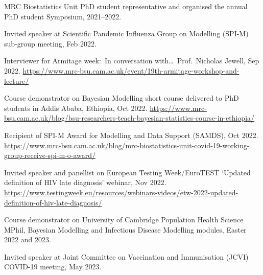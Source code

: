 \begin{spacing}{0.9}
    \begin{description}
        \item MRC Biostatistics Unit PhD student representative and organised the annual PhD student Symposium, 2021--2022.
        \item Invited speaker at Scientific Pandemic Influenza Group on Modelling (SPI-M) sub-group meeting, Feb 2022.
        \item Interviewer for Armitage week:\ In conversation with\ldots\ Prof.\ Nicholas Jewell, Sep 2022. \url{https://www.mrc-bsu.cam.ac.uk/event/19th-armitage-workshop-and-lecture/}
        \item Course demonstrator on Bayesian Modelling short course delivered to PhD students in Addis Ababa, Ethiopia, Oct 2022. \url{https://www.mrc-bsu.cam.ac.uk/blog/bsu-researchers-teach-bayesian-statistics-course-in-ethiopia/}
        \item Recipient of SPI-M Award for Modelling and Data Support (SAMDS), Oct 2022. \url{https://www.mrc-bsu.cam.ac.uk/blog/mrc-biostatistics-unit-covid-19-working-group-receive-spi-m-o-award/}
        \item Invited speaker and panellist on European Testing Week/EuroTEST `Updated definition of HIV late diagnosis' webinar, Nov 2022. \url{https://www.testingweek.eu/resources/webinars-videos/etw-2022-updated-definition-of-hiv-late-diagnosis/}
        \item Course demonstrator on University of Cambridge Population Health Science MPhil, Bayesian Modelling and Infectious Disease Modelling modules, Easter 2022 and 2023.
        \item Invited speaker at Joint Committee on Vaccination and Immunisation (JCVI) COVID-19 meeting, May 2023.
    \end{description}

\end{spacing}
